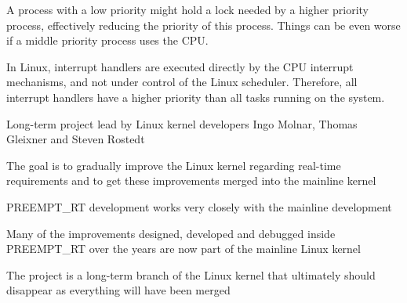 
  A process with a low priority might hold a lock needed by a higher
  priority process, effectively reducing the priority of this
  process. Things can be even worse if a middle priority process uses
  the CPU.



  In Linux, interrupt handlers are executed directly by the CPU
  interrupt mechanisms, and not under control of the Linux
  scheduler. Therefore, all interrupt handlers have a higher priority
  than all tasks running on the system.


  \startitemize
  \item Long-term project lead by Linux kernel developers Ingo Molnar,
    Thomas Gleixner and Steven Rostedt
    \startitemize
    \item {}
    \stopitemize
  \item The goal is to gradually improve the Linux kernel regarding
    real-time requirements and to get these improvements merged into
    the mainline kernel
    \startitemize
    \item PREEMPT\_RT development works very closely with the mainline
      development
    \stopitemize
  \item Many of the improvements designed, developed and debugged
    inside PREEMPT\_RT over the years are now part of the mainline
    Linux kernel
    \startitemize
    \item The project is a long-term branch of the Linux kernel that
      ultimately should disappear as everything will have been merged
    \stopitemize
  \stopitemize

